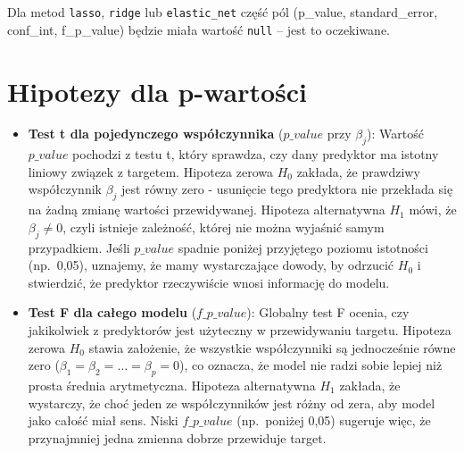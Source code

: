 \documentclass[12pt,a4paper]{article}
\begin{document}
Dla metod \texttt{lasso}, \texttt{ridge} lub \texttt{elastic\_net} część pól (p\_value, standard\_error, conf\_int, f\_p\_value) będzie miała wartość \texttt{null} – jest to oczekiwane.

\section{Hipotezy dla p-wartości}
\begin{itemize}
    \item \textbf{Test t dla pojedynczego współczynnika} (\(p\_value\) przy \(\beta_j\)):
    Wartość \(p\_value\) pochodzi z testu t, który sprawdza, czy dany predyktor ma istotny liniowy związek z targetem.
    Hipoteza zerowa \(H_0\) zakłada, że prawdziwy współczynnik \(\beta_j\) jest równy zero - usunięcie tego predyktora nie przekłada się na żadną zmianę wartości przewidywanej.
    Hipoteza alternatywna \(H_1\) mówi, że \(\beta_j \neq 0\), czyli istnieje zależność, której nie można wyjaśnić samym przypadkiem.
    Jeśli \(p\_value\) spadnie poniżej przyjętego poziomu istotności (np.\ 0,05), uznajemy, że mamy wystarczające dowody, by odrzucić \(H_0\) i stwierdzić, że predyktor rzeczywiście wnosi informację do modelu.

    \item \textbf{Test F dla całego modelu} (\(f\_p\_value\)):
    Globalny test F ocenia, czy jakikolwiek z predyktorów jest użyteczny w przewidywaniu targetu.
    Hipoteza zerowa \(H_0\) stawia założenie, że wszystkie współczynniki są jednocześnie równe zero (\(\beta_1 = \beta_2 = \dots = \beta_p = 0\)), co oznacza, że model nie radzi sobie lepiej niż prosta średnia arytmetyczna.
    Hipoteza alternatywna \(H_1\) zakłada, że wystarczy, że choć jeden ze współczynników jest różny od zera, aby model jako całość miał sens.
    Niski \(f\_p\_value\) (np.\ poniżej 0,05) sugeruje więc, że przynajmniej jedna zmienna dobrze przewiduje target.
\end{itemize}
\end{document}
